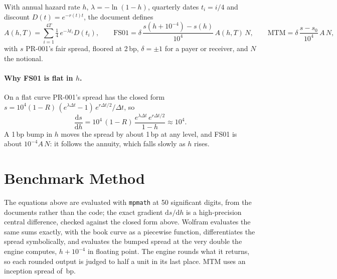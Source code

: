 \documentclass[11pt,a4paper]{article}
\begin{document}
\mkmframework

With annual hazard rate $h$, $\lambda=-\ln(1-h)$, quarterly dates $t_i=i/4$ and
discount $D(t)=e^{-r(t)t}$, the document defines
\begin{equation}
A(h,T)=\sum_{i=1}^{4T}\tfrac14\,e^{-\lambda t_i}D(t_i),\qquad
\text{FS01}=\delta\,\frac{s(h+10^{-4})-s(h)}{10^4}\,A(h,T)\,N,\qquad
\text{MTM}=\delta\,\frac{s-s_0}{10^4}\,A\,N,
\end{equation}
with $s$ PR-001's fair spread, floored at 2\,bp, $\delta=\pm1$ for a payer or receiver,
and $N$ the notional.

\paragraph{Why FS01 is flat in $h$.} On a flat curve PR-001's spread has the closed form
$s=10^4(1-R)\,(e^{\lambda\Delta t}-1)\,e^{r\Delta t/2}/\Delta t$, so
\begin{equation}
\frac{\mathrm{d}s}{\mathrm{d}h}=10^4\,(1-R)\,\frac{e^{\lambda\Delta t}\,e^{r\Delta t/2}}{1-h}
\approx 10^4 .
\end{equation}
A 1\,bp bump in $h$ moves the spread by about 1\,bp at any level, and FS01 is about
$10^{-4}A\,N$: it follows the annuity, which falls slowly as $h$ rises.

\section{Benchmark Method}

The equations above are evaluated with \texttt{mpmath} at 50 significant digits, from
the documents rather than the code; the exact gradient $\mathrm{d}s/\mathrm{d}h$ is a
high-precision central difference, checked against the closed form above. Wolfram
evaluates the same sums exactly, with the book curve as a piecewise function,
differentiates the spread symbolically, and evaluates the bumped spread at the very
double the engine computes, $h+10^{-4}$ in floating point. The engine rounds what it
returns, so each rounded output is judged to half a unit in its last place. MTM uses
an inception spread of \bmTradeSpread\,bp.

\mkmvalidation
\end{document}
